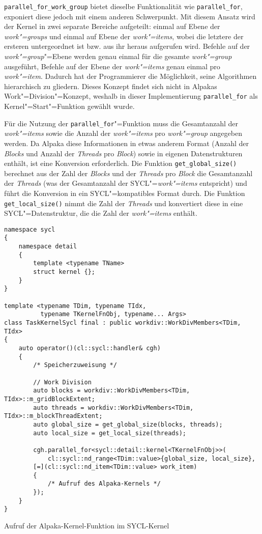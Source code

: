 \texttt{parallel\_for\_work\_group} bietet dieselbe Funktionalität wie
\texttt{parallel\_for}, exponiert diese jedoch mit einem anderen Schwerpunkt.
Mit diesem Ansatz wird der Kernel in zwei separate Bereiche aufgeteilt: einmal
auf Ebene der \textit{work"=groups} und einmal auf Ebene der
\textit{work"=items}, wobei die letztere der ersteren untergeordnet ist bzw.
aus ihr heraus aufgerufen wird. Befehle auf der \textit{work"=group}"=Ebene
werden genau einmal für die gesamte \textit{work"=group} ausgeführt, Befehle auf
der Ebene der \textit{work"=items} genau einmal pro \textit{work"=item}. Dadurch
hat der Programmierer die Möglichkeit, seine Algorithmen hierarchisch zu
gliedern. Dieses Konzept findet sich nicht in Alpakas Work"=Division"=Konzept,
weshalb in dieser Implementierung \texttt{parallel\_for} als
Kernel"=Start"=Funktion gewählt wurde.

Für die Nutzung der \texttt{parallel\_for}"=Funktion muss die Gesamtanzahl der
\textit{work"=items} sowie die Anzahl der \textit{work"=items} pro
\textit{work"=group} angegeben werden. Da Alpaka diese Informationen in etwas
anderem Format (Anzahl der \textit{Blocks} und Anzahl der \textit{Threads} pro
\textit{Block}) sowie in eigenen Datenstrukturen enthält, ist eine Konversion
erforderlich. Die Funktion \texttt{get\_global\_size()} berechnet aus der Zahl
der \textit{Blocks} und der \textit{Threads} pro \textit{Block} die Gesamtanzahl
der \textit{Threads} (was der Gesamtanzahl der SYCL"=\textit{work"=items}
entspricht) und führt die Konversion in ein SYCL"=kompatibles Format durch. Die
Funktion \texttt{get\_local\_size()} nimmt die Zahl der \textit{Threads} und
konvertiert diese in eine SYCL"=Datenstruktur, die die Zahl der
\textit{work"=items} enthält.

\begin{code}
    \begin{verbatim}
namespace sycl
{
    namespace detail
    {
        template <typename TName>
        struct kernel {};
    }
}

template <typename TDim, typename TIdx,
          typename TKernelFnObj, typename... Args>
class TaskKernelSycl final : public workdiv::WorkDivMembers<TDim, TIdx>
{
    auto operator()(cl::sycl::handler& cgh)
    {
        /* Speicherzuweisung */

        // Work Division
        auto blocks = workdiv::WorkDivMembers<TDim, TIdx>::m_gridBlockExtent;
        auto threads = workdiv::WorkDivMembers<TDim, TIdx>::m_blockThreadExtent;
        auto global_size = get_global_size(blocks, threads);
        auto local_size = get_local_size(threads);

        cgh.parallel_for<sycl::detail::kernel<TKernelFnObj>>(
            cl::sycl::nd_range<TDim::value>{global_size, local_size},
        [=](cl::sycl::nd_item<TDim::value> work_item)
        {
            /* Aufruf des Alpaka-Kernels */
        });
    }
}
    \end{verbatim}
    \caption{Aufruf der Alpaka-Kernel-Funktion im SYCL-Kernel}
    \label{implementierung:task:kernel:launch}
\end{code}

